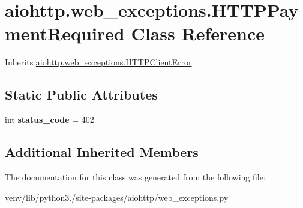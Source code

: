 \hypertarget{classaiohttp_1_1web__exceptions_1_1_h_t_t_p_payment_required}{}\section{aiohttp.\+web\+\_\+exceptions.\+H\+T\+T\+P\+Payment\+Required Class Reference}
\label{classaiohttp_1_1web__exceptions_1_1_h_t_t_p_payment_required}


Inherits \hyperlink{classaiohttp_1_1web__exceptions_1_1_h_t_t_p_client_error}{aiohttp.\+web\+\_\+exceptions.\+H\+T\+T\+P\+Client\+Error}.

\subsection*{Static Public Attributes}
\begin{DoxyCompactItemize}
\item 
\mbox{\label{classaiohttp_1_1web__exceptions_1_1_h_t_t_p_payment_required_a96a705da5932689e41a85d86add99709}} 
int {\bfseries status\+\_\+code} = 402
\end{DoxyCompactItemize}
\subsection*{Additional Inherited Members}


The documentation for this class was generated from the following file\+:\begin{DoxyCompactItemize}
\item 
venv/lib/python3./site-\/packages/aiohttp/web\+\_\+exceptions.\+py\end{DoxyCompactItemize}
